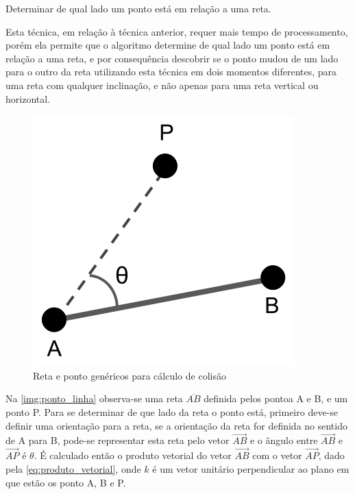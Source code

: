 \begin{alineas}[leftmargin=0pt, itemindent=20pt, labelwidth=15pt, labelsep=5pt, listparindent=1.25cm, align=left]
    \item Determinar de qual lado um ponto está em relação a uma reta.
    
    Esta técnica, em relação à técnica anterior, requer mais tempo de processamento, porém ela permite que o algoritmo determine de qual lado um ponto está em relação a uma reta, e por consequência descobrir se o ponto mudou de um lado para o outro da reta utilizando esta técnica em dois momentos diferentes, para uma reta com qualquer inclinação, e não apenas para uma reta vertical ou horizontal.
      
    \begin{figure}[!htb]
        \caption{\label{img:ponto_linha}Reta e ponto genéricos para cálculo de colisão}
    	\begin{center}
            \includegraphics[scale=0.45]{img/ponto_linha.png}
    	\end{center}
    \end{figure}
    
    Na \autoref{img:ponto_linha} observa-se uma reta $\overline{AB}$ definida pelos pontoa A e B, e um ponto P. Para se determinar de que lado da reta o ponto está, primeiro deve-se definir uma orientação para a reta, se a orientação da reta for definida no sentido de A para B, pode-se representar esta reta pelo vetor $\overrightarrow{AB}$ e o ângulo entre $\overrightarrow{AB}$ e $\overrightarrow{AP}$ é $\theta$. É calculado então o produto vetorial do vetor $\overrightarrow{AB}$ com o vetor $\overrightarrow{AP}$, dado pela \autoref{eq:produto_vetorial}, onde $\hat{k}$ é um vetor unitário perpendicular ao plano em que estão os ponto A, B e P.
    

\end{alineas}
